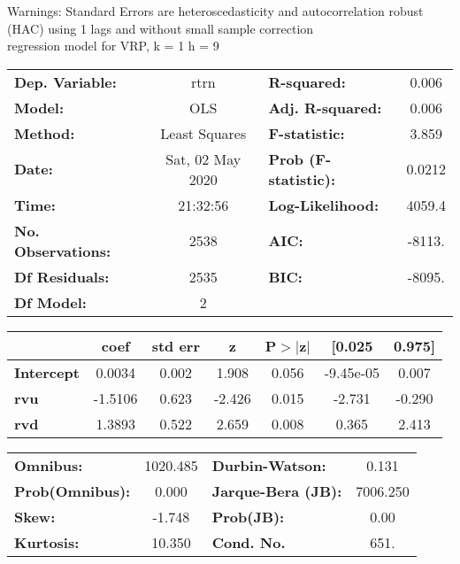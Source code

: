 Warnings: \newline
 [1] Standard Errors are heteroscedasticity and autocorrelation robust (HAC) using 1 lags and without small sample correction\\ 

regression model for VRP, k = 1 h = 9\begin{center}
\begin{tabular}{lclc}
\toprule
\textbf{Dep. Variable:}    &       rtrn       & \textbf{  R-squared:         } &     0.006   \\
\textbf{Model:}            &       OLS        & \textbf{  Adj. R-squared:    } &     0.006   \\
\textbf{Method:}           &  Least Squares   & \textbf{  F-statistic:       } &     3.859   \\
\textbf{Date:}             & Sat, 02 May 2020 & \textbf{  Prob (F-statistic):} &   0.0212    \\
\textbf{Time:}             &     21:32:56     & \textbf{  Log-Likelihood:    } &    4059.4   \\
\textbf{No. Observations:} &        2538      & \textbf{  AIC:               } &    -8113.   \\
\textbf{Df Residuals:}     &        2535      & \textbf{  BIC:               } &    -8095.   \\
\textbf{Df Model:}         &           2      & \textbf{                     } &             \\
\bottomrule
\end{tabular}
\begin{tabular}{lcccccc}
                   & \textbf{coef} & \textbf{std err} & \textbf{z} & \textbf{P$> |$z$|$} & \textbf{[0.025} & \textbf{0.975]}  \\
\midrule
\textbf{Intercept} &       0.0034  &        0.002     &     1.908  &         0.056        &    -9.45e-05    &        0.007     \\
\textbf{rvu}       &      -1.5106  &        0.623     &    -2.426  &         0.015        &       -2.731    &       -0.290     \\
\textbf{rvd}       &       1.3893  &        0.522     &     2.659  &         0.008        &        0.365    &        2.413     \\
\bottomrule
\end{tabular}
\begin{tabular}{lclc}
\textbf{Omnibus:}       & 1020.485 & \textbf{  Durbin-Watson:     } &    0.131  \\
\textbf{Prob(Omnibus):} &   0.000  & \textbf{  Jarque-Bera (JB):  } & 7006.250  \\
\textbf{Skew:}          &  -1.748  & \textbf{  Prob(JB):          } &     0.00  \\
\textbf{Kurtosis:}      &  10.350  & \textbf{  Cond. No.          } &     651.  \\
\bottomrule
\end{tabular}
\end{center}


